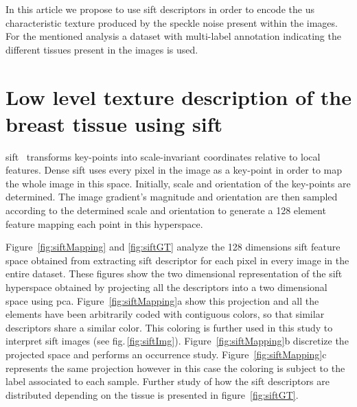 \documentclass[a4paper, 10pt, conference]{llncs}      %
\begin{document}
In this article we propose to use \ac{sift} descriptors in order to encode the \ac{us} characteristic texture produced by the speckle noise present within the images. For the mentioned analysis a dataset with multi-label annotation indicating the different tissues present in the images is used.


\section{Low level texture description of the breast tissue using \ac{sift} }
\acf{sift}~\cite{lowe2004distinctive} transforms key-points into scale-invariant coordinates relative to local features. Dense \ac{sift} uses every pixel in the image as a key-point in order to map the whole image in this space. Initially, scale and orientation of the key-points are determined. The image gradient's magnitude and orientation are then sampled according to the determined scale and orientation to generate a 128 element feature mapping each point in this hyperspace. 

Figure~\ref{fig:siftMapping} and \ref{fig:siftGT} analyze the 128 dimensions \ac{sift} feature space obtained from extracting \ac{sift} descriptor for each pixel in every image in the entire dataset. These figures show the two dimensional representation of the \ac{sift} hyperspace obtained by projecting all the descriptors into a two dimensional space using \ac{pca}. Figure~\ref{fig:siftMapping}a show this projection and all the elements have been arbitrarily coded with contiguous colors, so that similar descriptors share a similar color. This coloring is further used in this study to interpret \ac{sift} images (see fig.\,\ref{fig:siftImg}). Figure~\ref{fig:siftMapping}b discretize the projected space and performs an occurrence study. Figure~\ref{fig:siftMapping}c represents the same projection however in this case the coloring is subject to the label associated to each sample. Further study of how the \ac{sift} descriptors are distributed depending on the tissue is presented in figure~\ref{fig:siftGT}. 
\end{document}

